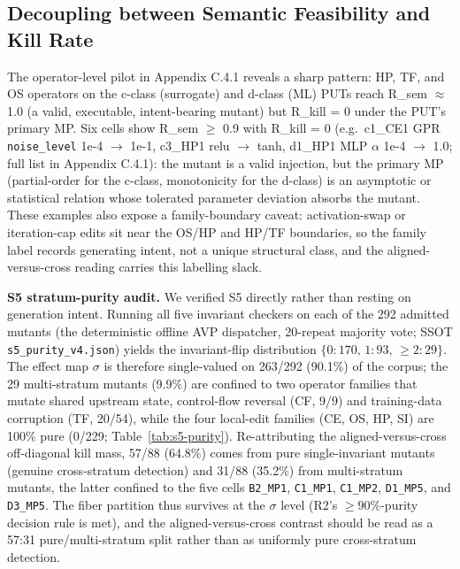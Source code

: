 \documentclass[manuscript,screen,review]{acmart}
\begin{document}
\subsection{Decoupling between Semantic Feasibility and Kill Rate}\label{decoupling-between-r_sem-and-r_kill}

The operator-level pilot in Appendix C.4.1 reveals a sharp pattern: HP, TF,
and OS operators on the c-class (surrogate) and d-class (ML) PUTs reach
R\_sem $\approx$ 1.0 (a valid, executable, intent-bearing mutant) but
R\_kill = 0 under the PUT's primary MP. Six cells show R\_sem $\geq$ 0.9 with
R\_kill = 0 (e.g.\ c1\_CE1 GPR \texttt{noise\_level} 1e-4 $\to$ 1e-1, c3\_HP1
relu $\to$ tanh, d1\_HP1 MLP $\alpha$ 1e-4 $\to$ 1.0; full list in Appendix C.4.1):
the mutant is a valid injection, but the primary MP (partial-order for the
c-class, monotonicity for the d-class) is an asymptotic or statistical relation
whose tolerated parameter deviation absorbs the mutant. These examples also
expose a family-boundary caveat: activation-swap or iteration-cap edits sit near
the OS/HP and HP/TF boundaries, so the family label records generating intent,
not a unique structural class, and the aligned-versus-cross reading carries this
labelling slack.

\label{s5-audit}
\textbf{S5 stratum-purity audit.} We verified S5 directly rather than
resting on generation intent. Running all five invariant checkers on
each of the 292 admitted mutants (the deterministic offline AVP
dispatcher, 20-repeat majority vote; SSOT \texttt{s5\_purity\_v4.json})
yields the invariant-flip distribution $\{0{:}170,\,1{:}93,\,\ge 2{:}29\}$.
The effect map $\sigma$ is therefore single-valued on 263/292 (90.1\%) of
the corpus; the 29 multi-stratum mutants (9.9\%) are confined to two
operator families that mutate shared upstream state, control-flow
reversal (CF, 9/9) and training-data corruption (TF, 20/54), while the
four local-edit families (CE, OS, HP, SI) are 100\% pure (0/229;
Table~\ref{tab:s5-purity}). Re-attributing the aligned-versus-cross
off-diagonal kill mass, 57/88 (64.8\%) comes from pure single-invariant
mutants (genuine cross-stratum detection) and 31/88 (35.2\%) from
multi-stratum mutants, the latter confined to the five cells
\texttt{B2\_MP1}, \texttt{C1\_MP1}, \texttt{C1\_MP2}, \texttt{D1\_MP5},
and \texttt{D3\_MP5}. The fiber partition thus survives at the $\sigma$
level (R2's $\ge 90\%$-purity decision rule is met), and the
aligned-versus-cross contrast should be read as a 57:31 pure/multi-stratum
split rather than as uniformly pure cross-stratum detection.
\end{document}
